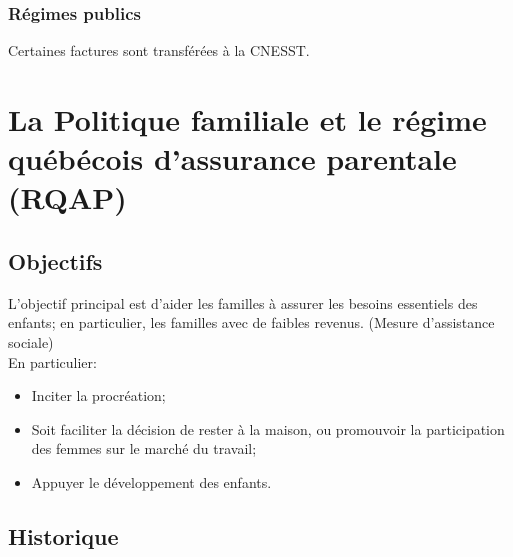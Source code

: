 \documentclass[10pt, french]{article}
\begin{document}
\begin{multicols*}{3}
\subsubsection*{Régimes publics}
Certaines factures sont transférées à la CNESST. 



\newpage
\section{La Politique familiale et le régime québécois d’assurance parentale (RQAP)}
\subsection{Objectifs}
L'objectif principal est d'aider les familles à assurer les besoins essentiels des enfants; en particulier, les familles avec de faibles revenus. (Mesure d'assistance sociale)\\

En particulier:
\begin{itemize}[leftmargin = *]
	\item	Inciter la procréation;
	\item	Soit faciliter la décision de rester à la maison, ou promouvoir la participation des femmes sur le marché du travail;
	\item	Appuyer le développement des enfants.
\end{itemize}


\subsection{Historique}


\end{multicols*}
\end{document}
